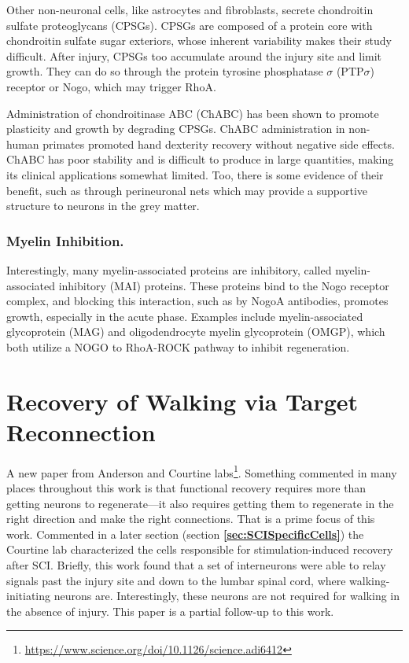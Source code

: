 Other non-neuronal cells, like astrocytes and fibroblasts, secrete chondroitin sulfate proteoglycans (CPSGs). CPSGs are composed of a protein core with chondroitin sulfate sugar exteriors, whose inherent variability makes their study difficult. After injury, CPSGs too accumulate around the injury site and limit growth.  They can do so through the protein tyrosine phosphatase $\sigma$ (PTP$\sigma$) receptor or Nogo, which may trigger RhoA.  \newline

Administration of chondroitinase ABC (ChABC) has been shown to promote plasticity and growth by degrading CPSGs. ChABC administration in non-human primates promoted hand dexterity recovery without negative side effects. ChABC has poor stability and is difficult to produce in large quantities, making its clinical applications somewhat limited. Too, there is some evidence of their benefit, such as through perineuronal nets which may provide a supportive structure to neurons in the grey matter.\newline  


\subsubsection{Myelin Inhibition.}

Interestingly, many myelin-associated proteins are inhibitory, called myelin-associated inhibitory (MAI) proteins. These proteins bind to the Nogo receptor complex, and blocking this interaction, such as by NogoA antibodies, promotes growth, especially in the acute phase. Examples include myelin-associated glycoprotein (MAG) and oligodendrocyte myelin glycoprotein (OMGP), which both utilize a NOGO to RhoA-ROCK pathway to inhibit regeneration. 

\section{Recovery of Walking via Target Reconnection}

A new paper from Anderson and Courtine labs\footnote{\url{https://www.science.org/doi/10.1126/science.adi6412}}.  Something commented in many places throughout this work is that functional recovery requires more than getting neurons to regenerate---it also requires getting them to regenerate in the right direction and make the right connections. That is a prime focus of this work. Commented in a later section (section \textbf{\ref{sec:SCISpecificCells}}) the Courtine lab characterized the cells responsible for stimulation-induced recovery after SCI. Briefly, this work found that a set of interneurons were able to relay signals past the injury site and down to the lumbar spinal cord, where walking-initiating neurons are. Interestingly, these neurons are not required for walking in the absence of injury. This paper is a partial follow-up to this work.\newline

